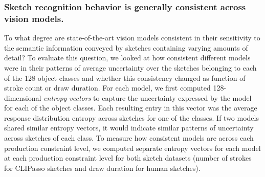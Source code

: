 \documentclass[10pt,letterpaper]{article}
\begin{document}
\subsubsection{Sketch recognition behavior is generally consistent across vision models.} %

To what degree are state-of-the-art vision models consistent in their sensitivity to the semantic information conveyed by sketches containing varying amounts of detail?
To evaluate this question, we looked at how consistent different models were in their patterns of average uncertainty over the sketches belonging to each of the 128 object classes and whether this consistency changed as function of stroke count or draw duration.
For each model, we first computed 128-dimensional \textit{entropy vectors} to capture the uncertainty expressed by the model for each of the object classes. 
Each resulting entry in this vector was the average response distribution entropy across sketches for one of the classes.
If two models shared similar entropy vectors, it would indicate similar patterns of uncertainty across sketches of each class.
To measure how consistent models are across each production constraint level, we computed separate entropy vectors for each model at each production constraint level for both sketch datasets (number of strokes for CLIPasso sketches and draw duration for human sketches).
\end{document}
